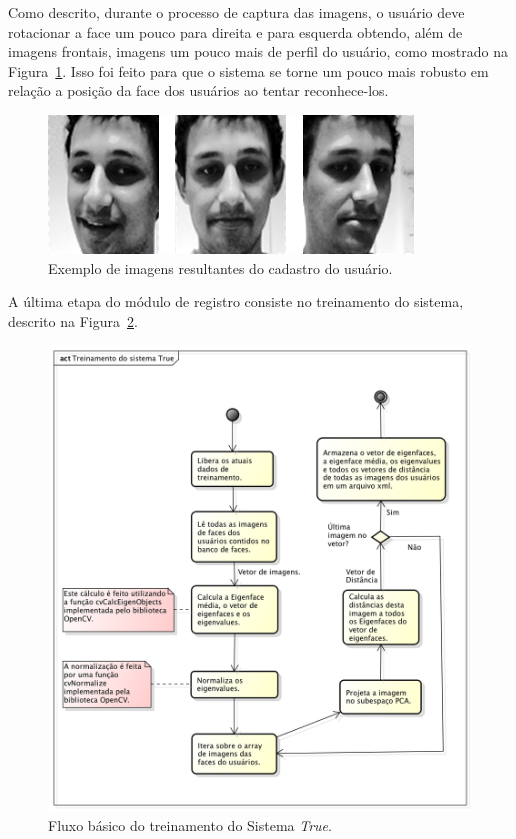	Como descrito, durante o processo de captura das imagens, o usuário deve rotacionar a face um pouco para direita e para esquerda obtendo, além de imagens frontais, imagens um pouco mais de perfil do usuário, como mostrado na Figura~\ref{fig:imgs-cadastro}. Isso foi feito para que o sistema se torne um pouco mais robusto em relação a posição da face dos usuários ao tentar reconhece-los.

		\begin{figure}[H]
			\begin{center}
				\includegraphics[scale=0.4]{figuras/4.ProblemaEProposta/face-registro.png}
			\end{center}
			\caption{Exemplo de imagens resultantes do cadastro do usuário.}
			\label{fig:imgs-cadastro}
		\end{figure}	

	A última etapa do módulo de registro consiste no treinamento do sistema, descrito na Figura~\ref{fig:treinamento}.

		\begin{figure}[hbt]
			\begin{center}
				\includegraphics[scale=0.7]{figuras/4.ProblemaEProposta/diagrama-registro.png}
			\end{center}
			\caption{Fluxo básico do treinamento do Sistema \textit{True}.}
			\label{fig:treinamento}
		\end{figure}	